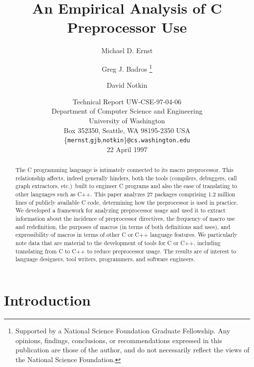 \documentclass[11pt]{article}
\def\numpackages{27}
\def\numlines{1.2 million}
\begin{document}
% 


\title{An Empirical Analysis of C Preprocessor Use}

\author{Michael D. Ernst%
  \and Greg J. Badros%
  \thanks{Supported by a National Science Foundation
    Graduate Fellowship. Any opinions, findings, conclusions, or
    recommendations expressed in this publication are those of the
    author, and do not necessarily reflect the views of the National
    Science Foundation.}
  \and David Notkin}

\date{Technical Report UW-CSE-97-04-06 \\
Department of Computer Science and Engineering \\
University of Washington \\
Box 352350, Seattle, WA  98195-2350  USA \\
{\small \{{\tt mernst},{\tt gjb},{\tt notkin}\}{\tt @cs.washington.edu}} \\
22 April 1997}  

\maketitle

\begin{abstract}

  The C programming language is intimately connected to its macro
  preprocessor.  This relationship affects, indeed generally hinders, both
  the tools (compilers, debuggers, call graph extractors, etc.)\ built to
  engineer C programs and also the ease of translating to other languages
  such as C++.  This paper analyzes {\numpackages} packages comprising
  {\numlines} lines of publicly available C code, determining how
  the preprocessor is used in practice.  We developed a framework for
  analyzing preprocessor usage and used it to extract information about the
  incidence of preprocessor directives, the frequency of macro use and
  redefinition, the purposes of macros (in terms of both definitions and
  uses), and expressibility of macros in terms of other C or C++
  language features.  We particularly note
  data that are material to the development of tools for C or C++,
  including translating from C to C++ to reduce preprocessor usage.
  The results are of interest to language designers, tool writers,
  programmers, and software engineers.
\end{abstract}

\bigskip

\section{Introduction}
\end{document}
